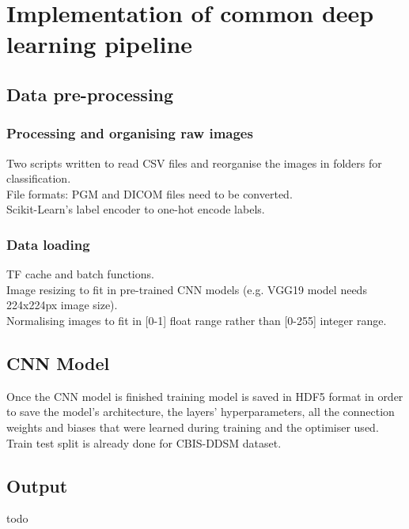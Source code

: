 \section{Implementation of common deep learning pipeline}


\subsection{Data pre-processing}

\subsubsection{Processing and organising raw images}

Two scripts written to read CSV files and reorganise the images in folders for classification.\\

File formats: PGM and DICOM files need to be converted.\\

Scikit-Learn's label encoder to one-hot encode labels.


\subsubsection{Data loading}

TF cache and batch functions.\\

Image resizing to fit in pre-trained CNN models (e.g. VGG19 model needs 224x224px image size).\\

Normalising images to fit in [0-1] float range rather than [0-255] integer range.


\subsection{CNN Model}

Once the CNN model is finished training model is saved in HDF5 format in order to save the model's architecture, the layers' hyperparameters, all the connection weights and biases that were learned during training \cite{Geron2019} and the optimiser used.\\

Train test split is already done for CBIS-DDSM dataset.


\subsection{Output}

todo
